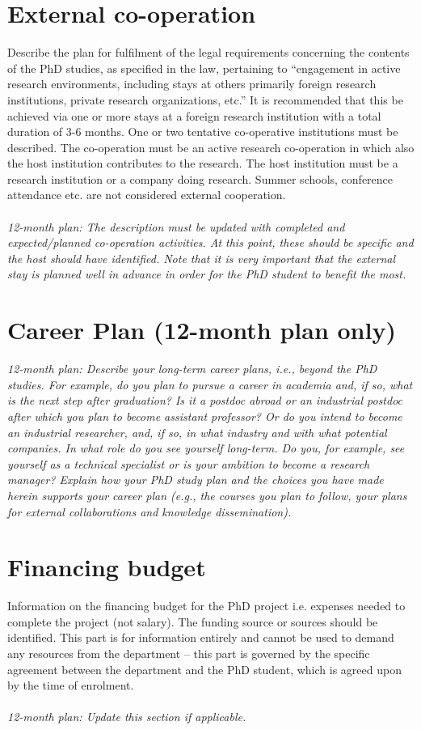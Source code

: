 \section{External co-operation}
Describe the plan for fulfilment of the legal requirements concerning the contents of the PhD studies, as specified in the law, pertaining to “engagement in active research environments, including stays at others primarily foreign research institutions, private research organizations, etc.” It is recommended that this be achieved via one or more stays at a foreign research institution with a total duration of 3-6 months. One or two tentative co-operative institutions must be described. The co-operation must be an active research co-operation in which also the host institution contributes to the research. The host institution must be a research institution or a company doing research. Summer schools, conference attendance etc. are not considered external cooperation. 
\\
\\
\textit{
12-month plan: The description must be updated with completed and expected/planned co-operation activities. At this point, these should be specific and the host should have identified. Note that it is very important that the external stay is planned well in advance in order for the PhD student to benefit the most.} 

\section{Career Plan (12-month plan only)}
\textit{12-month plan: Describe your long-term career plans, i.e., beyond the PhD studies. For example, do you plan to pursue a career in academia and, if so, what is the next step after graduation? Is it a postdoc abroad or an industrial postdoc after which you plan to become assistant professor? Or do you intend to become an industrial researcher, and, if so, in what industry and with what potential companies. In what role do you see yourself long-term. Do you, for example, see yourself as a technical specialist or is your ambition to become a research manager? Explain how your PhD study plan and the choices you have made herein supports your career plan (e.g., the courses you plan to follow, your plans for external collaborations and knowledge dissemination).}


\section{Financing budget}
Information on the financing budget for the PhD project i.e. expenses needed to complete the project (not salary). The funding source or sources should be identified. This part is for information entirely and cannot be used to demand any resources from the department – this part is governed by the specific agreement between the department and the PhD student, which is agreed upon by the time of enrolment.
\\
\\
\textit{12-month plan: Update this section if applicable.}

